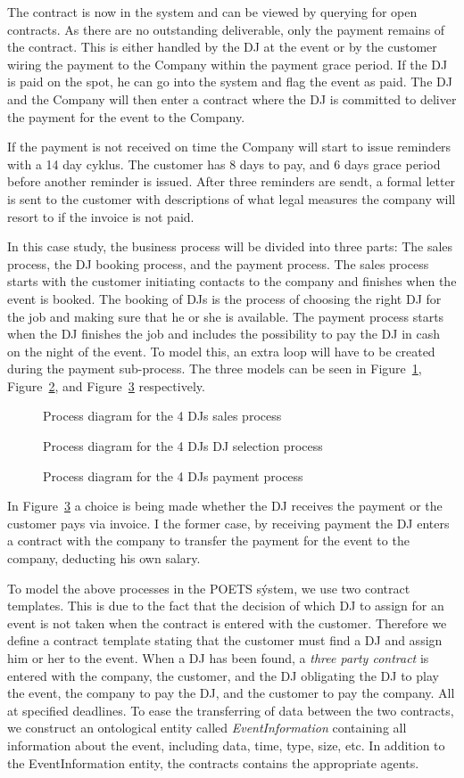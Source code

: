 \documentclass[envcountsame]{llncs}
\newcommand{\billede}[3]{
  \begin{figure}[!ht]
    \begin{center}
      \IfFileExists{#2}{
        \texttt{[image: \#2]}
      }{}
      \begin{minipage}{0.8\textwidth}
        \caption{#3}
      \end{minipage}
    \end{center}
  \end{figure}
}
\begin{document}
The contract is now in the system and can be viewed by querying for
open contracts. As there are no outstanding deliverable, only the
payment remains of the contract. This is either handled by the DJ at
the event or by the customer wiring the payment to the Company within
the payment grace period. If the DJ is paid on the spot, he can go
into the system and flag the event as paid. The DJ and the Company
will then enter a contract where the DJ is committed to deliver the
payment for the event to the Company.

If the payment is not received on time the Company will start to issue
reminders with a 14 day cyklus. The customer has 8 days to pay, and 6 days grace period before another reminder is issued. After three reminders are sendt, a formal letter is sent to the customer with descriptions of what legal measures the company will resort to if the invoice is not paid.

In this case study, the business process will be divided into three
parts: The sales process, the DJ booking process, and the payment
process. The sales process starts with the customer initiating
contacts to the company and finishes when the event is booked. The booking of DJs is the process of choosing the right DJ for the job and making sure that he or she is available. The payment process starts when the DJ finishes the job and includes the possibility to pay the DJ in cash on the night of
the event. To model this, an extra loop will have to be created during
the payment sub-process. The three models can be seen in
Figure~\ref{fig:FourDJsSales}, Figure~\ref{fig:FourDJsDJ}, and
Figure~\ref{fig:FourDJsPayment} respectively.

\billede{0.55}{FourDJsSales.pdf}{Process diagram for the 4 DJs sales
  process \label{fig:FourDJsSales}}
\billede{0.55}{FourDJsDJ.pdf}{Process diagram for the 4 DJs DJ
  selection process \label{fig:FourDJsDJ}}
\billede{0.55}{FourDJsPayment.pdf}{Process diagram for the 4 DJs
  payment process \label{fig:FourDJsPayment}}

In Figure~\ref{fig:FourDJsPayment} a choice is being made whether the
DJ receives the payment or the customer pays via invoice. I the former
case, by receiving payment the DJ enters a contract with the company
to transfer the payment for the event to the company, deducting his
own salary.

To model the above processes in the POETS sýstem, we use two contract templates. This is due to the fact that the decision of which DJ to assign for an event is not taken when the contract is entered with the customer. Therefore we define a contract template stating that the customer must find a DJ and assign him or her to the event. When a DJ has been found, a \textit{three party contract} is entered with the company, the customer, and the DJ obligating the DJ to play the event, the company to pay the DJ, and the customer to pay the company. All at specified deadlines. To ease the transferring of data between the two contracts, we construct an ontological entity called \textit{EventInformation} containing all information about the event, including data, time, type, size, etc. In addition to the EventInformation entity, the contracts contains the appropriate agents.
\end{document}

